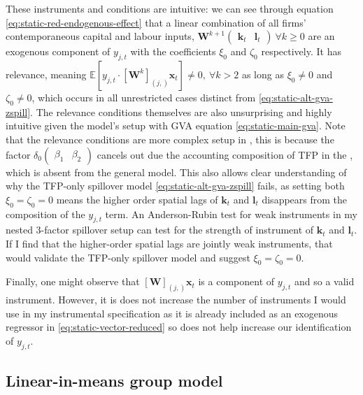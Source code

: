 These instruments and conditions are intuitive:
we can see through equation \eqref{eq:static-red-endogenous-effect} that
a linear combination of all firms' contemporaneous capital and labour inputs,
$\mathbf W^{k+1}\begin{pmatrix}\mathbf k_t & \mathbf l_t\end{pmatrix}\ \forall k\geq0$ 
are an exogenous component of $y_{j,t}$ with the coefficients $\xi_0$ and $\zeta_0$ respectively.
It has relevance, meaning $\mathbb E[y_{j,t}\cdot [\mathbf W^k]_{(j,)}\mathbf x_t]\neq 0,\ \forall k>2$
as long as $\xi_0\neq 0$ and $\zeta_0 \neq 0$,
which occurs in all unrestricted cases distinct from \eqref{eq:static-alt-gva-zspill}.
The relevance conditions themselves are also unsurprising and highly intuitive
given the model's setup with GVA equation \eqref{eq:static-main-gva}.
Note that the relevance conditions are more complex setup in \cite{Bramoulle2009},
this is because the factor $\delta_0 \begin{pmatrix}\beta_1 & \beta_2\end{pmatrix}$
cancels out due the accounting composition of TFP in the , which is absent from the general model.
This also allows clear understanding of why the TFP-only spillover model \eqref{eq:static-alt-gva-zspill} fails,
as setting both $\xi_0=\zeta_0=0$ means the higher order spatial lags of $\mathbf k_t$ and $\mathbf l_t$
disappears from the composition of the $y_{j,t}$ term.
An Anderson-Rubin test for weak instruments in my nested 3-factor spillover setup
can test for the strength of instrument of $\mathbf k_t$ and $\mathbf l_t$.
If I find that the higher-order spatial lags are jointly weak instruments,
that would validate the TFP-only spillover model and suggest $\xi_0=\zeta_0=0$.
\par
Finally, one might observe that $[\mathbf W]_{(j,)}\mathbf x_t$
is a component of $y_{j,t}$ and so a valid instrument.
However, it is does not increase the number of instruments I would use in my instrumental specification
as it is already included as an exogenous regressor in \ref{eq:static-vector-reduced}
so does not help increase our identification of $y_{j,t}$.


\subsection{Linear-in-means group model}
\label{ss:model-lmm}

